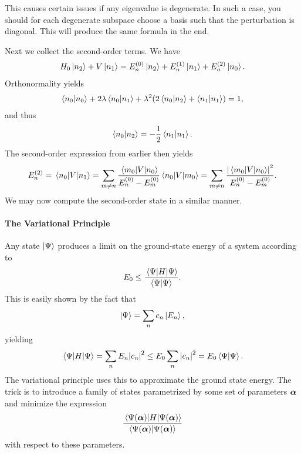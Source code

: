 This causes certain issues if any eigenvalue is degenerate. In such a case, you should for each degenerate subspace choose a basis such that the perturbation is diagonal. This will produce the same formula in the end.

Next we collect the second-order terms. We have
\begin{align*}
	H_{0}\ket{n_{2}} + V\ket{n_{1}} = E_{n}^{(0)}\ket{n_{2}} + E_{n}^{(1)}\ket{n_{1}} + E_{n}^{(2)}\ket{n_{0}}.
\end{align*}
Orthonormality yields
\begin{align*}
	\braket{n_{0}} + 2\lambda\braket{n_{0}}{n_{1}} + \lambda^{2}(2\braket{n_{0}}{n_{2}} + \braket{n_{1}}{n_{1}}) = 1,
\end{align*}
and thus
\begin{align*}
	\braket{n_{0}}{n_{2}} = -\frac{1}{2}\braket{n_{1}}{n_{1}}.
\end{align*}
The second-order expression from earlier then yields
\begin{align*}
	E_{n}^{(2)} = \mel{n_{0}}{V}{n_{1}} = \sum\limits_{m\neq n}\frac{\mel{m_{0}}{V}{n_{0}}}{E_{n}^{(0)} - E_{m}^{(0)}}\mel{n_{0}}{V}{m_{0}} = \sum\limits_{m\neq n}\frac{\abs{\mel{m_{0}}{V}{n_{0}}}^{2}}{E_{n}^{(0)} - E_{m}^{(0)}}.
\end{align*}
We may now compute the second-order state in a similar manner.

\paragraph{The Variational Principle}
Any state $\ket{\Psi}$ produces a limit on the ground-state energy of a system according to
\begin{align*}
	E_{0} \leq \frac{\expval{H}{\Psi}}{\braket{\Psi}}.
\end{align*}
This is easily shown by the fact that
\begin{align*}
	\ket{\Psi} = \sum\limits_{n}c_{n}\ket{E_{n}},
\end{align*}
yielding
\begin{align*}
	\expval{H}{\Psi} = \sum\limits_{n}E_{n}\abs{c_{n}}^{2} \leq E_{0}\sum\limits_{n}\abs{c_{n}}^{2} = E_{0}\braket{\Psi}.
\end{align*}
The variational principle uses this to approximate the ground state energy. The trick is to introduce a family of states parametrized by some set of parameters $\vb*{\alpha}$ and minimize the expression
\begin{align*}
	\frac{\expval{H}{\Psi(\vb*{\alpha})}}{\braket{\Psi(\vb*{\alpha})}}
\end{align*}
with respect to these parameters.

